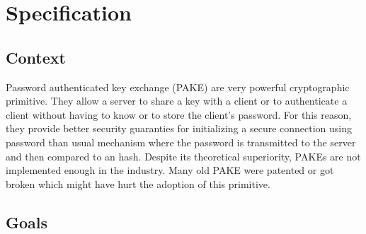 \documentclass[../report.tex]{subfiles}
\begin{document}
\chapter{Specification}
\section*{Context}






Password authenticated key exchange (PAKE) are very powerful cryptographic primitive. They allow a server to share a key with a client or to authenticate a client without having to know or to store the client's password.
For this reason, they provide better security guaranties for initializing a secure connection using password than usual mechanism where the password is transmitted to the server and then compared to an hash.
Despite its theoretical superiority, PAKEs are not implemented enough in the industry. Many old PAKE were patented or got broken which might have hurt the adoption of this primitive.



\section*{Goals}


% 
% 
% 
% 
\end{document}
